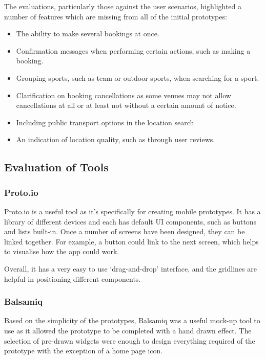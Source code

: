 The evaluations, particularly those against the user scenarios, highlighted a
number of features which are missing from all of the initial prototypes:

\begin{itemize}
	\item The ability to make several bookings at once.
	\item Confirmation messages when performing certain actions, such as making
		a booking.
	\item Grouping sports, such as team or outdoor sports, when searching for a
		sport.
	\item Clarification on booking cancellations as some venues may not allow
		cancellations at all or at least not without a certain amount of
		notice.
	\item Including public transport options in the location search
	\item An indication of location quality, such as through user reviews.
\end{itemize}

\subsection{Evaluation of Tools}

\subsubsection{Proto.io}

Proto.io\cite{protoio} is a useful tool as it's specifically for creating
mobile prototypes.  It has a library of different devices and each has default
UI components, such as buttons and lists built-in. Once a number of screens
have been designed, they can be linked together. For example, a button could
link to the next screen, which helps to visualise how the app could work.

Overall, it has a very easy to use `drag-and-drop' interface, and the gridlines
are helpful in positioning different components.

\subsubsection{Balsamiq}

Based on the simplicity of the prototypes, Balsamiq\cite{balsamiq} was a useful
mock-up tool to use as it allowed the prototype to be completed with a hand
drawn effect.  The selection of pre-drawn widgets were enough to design
everything required of the prototype with the exception of a home page icon.


